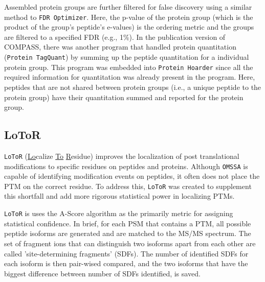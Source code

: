 Assembled protein groups are further filtered for false discovery using a similar method to \texttt{FDR Optimizer}. Here, the p-value of the protein group (which is the product of the group's peptide's e-values) is the ordering metric and the groups are filtered to a specified FDR (e.g., 1\%). In the publication version of COMPASS, there was another program that handled protein quantitation (\texttt{Protein TagQuant}) by summing up the peptide quantitation for a individual protein group. This program was embedded into \texttt{Protein Hoarder} since all the required information for quantitation was already present in the program. Here, peptides that are not shared between protein groups (i.e., a unique peptide to the protein group) have their quantitation summed and reported for the protein group.

\subsection*{LoToR}
\texttt{LoToR} (\underline{Lo}calize \underline{To} \underline{R}esidue) improves the localization of post translational modifications to specific residues on peptides and proteins. Although \texttt{OMSSA} is capable of identifying modification events on peptides, it often does not place the PTM on the correct residue. To address this, \texttt{LoToR} was created to supplement this shortfall and add more rigorous statistical power in localizing PTMs. 

\texttt{LoToR} is uses the A-Score algorithm as the primarily metric for assigning statistical confidence.\cite{ascore} In brief, for each PSM that contains a PTM, all possible peptide isoforms are generated and are matched to the MS/MS spectrum. The set of fragment ions that can distinguish two isoforms apart from each other are called 'site-determining fragments' (SDFs). The number of identified SDFs for each isoform is then pair-wised compared, and the two isoforms that have the biggest difference between number of SDFs identified, is saved.

